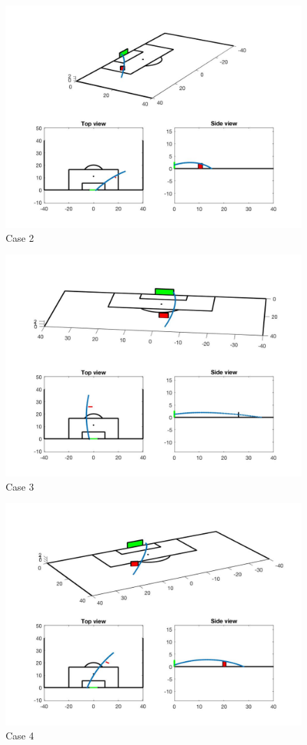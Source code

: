 \documentclass[12pt]{article}
\begin{document}
\begin{figure}[htb]
\centering
\includegraphics[width=.75\textwidth]{case2.jpg}
\caption{Case 2}
\label{fig::MyFigure}
\end{figure}

\begin{figure}[htb]
\centering
\includegraphics[width=.75\textwidth]{case3.jpg}
\caption{Case 3}
\label{fig::MyFigure}
\end{figure}

\begin{figure}[htb]
\centering
\includegraphics[width=.75\textwidth]{case4.jpg}
\caption{Case 4}
\label{fig::MyFigure}
\end{figure}
\end{document}

